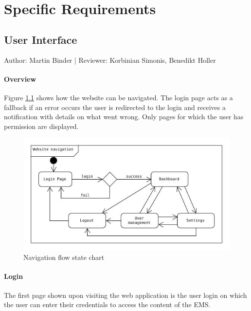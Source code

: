\documentclass{scrreprt}
\begin{document}
\chapter{Specific Requirements} 

\section{User Interface}
Author: Martin Binder |
Reviewer: Korbinian Simonis, Benedikt Holler
\subsubsection{Overview}
Figure \ref{navigation} shows how the website can be navigated. The login page acts as a fallback if an error occurs the user is redirected to the login and receives a notification with details on what went wrong. Only pages for which the user has permission are displayed.

\begin{figure}[h]
	\centering
	\includegraphics[width=13cm]{websiteStateChart.jpg}
	\caption{Navigation flow state chart}
	\label{navigation}
\end{figure}

\subsubsection{Login}
The first page shown upon visiting the web application is the user login on which the user can enter their credentials to access the content of the EMS.
\end{document}
